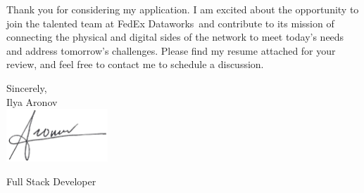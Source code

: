 \documentclass[11pt]{letter}
\def\myname{Ilya Aronov}
\def\mytitle{Full Stack Developer}
\def\companyName{FedEx Dataworks}
\def\companyMission{of connecting the physical and digital sides of the network to meet today's needs and address tomorrow's challenges}
\begin{document}
Thank you for considering my application. I am excited about the opportunity to join the talented team at \companyName\, and contribute to its mission \companyMission.
Please find my resume attached for your review, and feel free to contact me to schedule a discussion.


\vspace{0.1in}
\vfill

\begin{flushright}

\vspace{-0.1in}
Sincerely, \\
\myname\\

\includegraphics[width=1.5in]{signiture_no_background.png}

\vspace{-0.1in}
\mytitle

\end{flushright}
\end{document}
